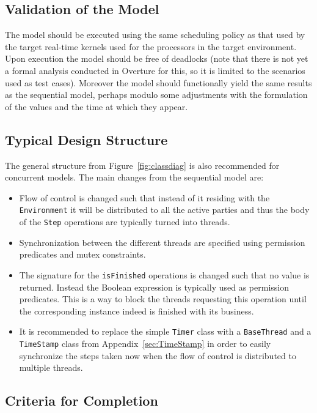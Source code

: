 \documentclass{overturerepchap}
\begin{document}
\subsection{Validation of the Model}

The model should be executed using the same scheduling policy as that
used by the target real-time kernels used for the processors in the
target environment. Upon execution the model should be free of
deadlocks (note that there is not yet a formal analysis conducted in 
Overture for this, so it is limited to the scenarios used as test
cases). Moreover the model should functionally yield the same
results as the sequential model, perhaps modulo some adjustments with
the formulation of the values and the time at which they appear.

\subsection{Typical Design Structure}\label{sec:designconcur}

The general structure from Figure~\ref{fig:classdiag} is also recommended 
for concurrent models. The main changes from the sequential model are:

\begin{itemize}
\item Flow of control is changed such that instead of it residing with the
      \texttt{Environment} it will be distributed to all the active parties
      and thus the body of the \texttt{Step} operations are typically 
      turned into threads. 
\item Synchronization between the different threads are specified using
      permission predicates and mutex constraints.
\item The signature for the \texttt{isFinished} operations is changed 
      such that no value is returned. Instead the Boolean expression is 
      typically used as permission predicates. This is a way to block
      the threads requesting this operation until the corresponding 
      instance indeed is finished with its business.
\item It is recommended to replace the simple \texttt{Timer} class with
      a \texttt{BaseThread} and a \texttt{TimeStamp}
      class from Appendix~\ref{sec:TimeStamp} in order
      to easily synchronize the steps taken now when the flow of control
      is distributed to multiple threads.
\end{itemize}

\subsection{Criteria for Completion}
\end{document}
